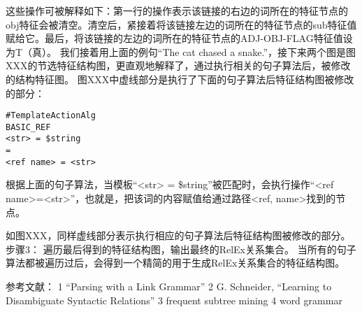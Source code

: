 这些操作可被解释如下：第一行的操作表示该链接的右边的词所在的特征节点的obj特征会被清空。清空后，紧接着将该链接左边的词所在的特征节点的sub特征值赋给它。最后，将该链接的左边的词所在的特征节点的ADJ-OBJ-FLAG特征值设为T（真）。
我们接着用上面的例句“The cat chased a snake.”，接下来两个图是图XXX的节选特征结构图，更直观地解释了，通过执行相关的句子算法后，被修改的结构特征图。  
图XXX中虚线部分是执行了下面的句子算法后特征结构图被修改的部分：
\begin{verbatim}
#TemplateActionAlg
BASIC_REF
<str> = $string
=
<ref name> = <str>
\end{verbatim}
根据上面的句子算法，当模板“<str> = \$string”被匹配时，会执行操作“<ref name>=<str>”，也就是，把该词的内容赋值给通过路径<ref, name>找到的节点。
 
如图XXX，同样虚线部分表示执行相应的句子算法后特征结构图被修改的部分。
     步骤3： 遍历最后得到的特征结构图，输出最终的RelEx关系集合。
当所有的句子算法都被遍历过后，会得到一个精简的用于生成RelEx关系集合的特征结构图。






参考文献：
1 “Parsing with a Link Grammar”
2 G. Schneider, ``Learning to Disambiguate Syntactic
Relations''
3 frequent subtree mining
4 word grammar
